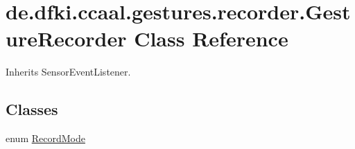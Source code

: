 \hypertarget{classde_1_1dfki_1_1ccaal_1_1gestures_1_1recorder_1_1_gesture_recorder}{\section{de.\-dfki.\-ccaal.\-gestures.\-recorder.\-Gesture\-Recorder Class Reference}
\label{classde_1_1dfki_1_1ccaal_1_1gestures_1_1recorder_1_1_gesture_recorder}
}


Inherits Sensor\-Event\-Listener.

\subsection*{Classes}
\begin{DoxyCompactItemize}
\item 
enum \hyperlink{enumde_1_1dfki_1_1ccaal_1_1gestures_1_1recorder_1_1_gesture_recorder_1_1_record_mode}{Record\-Mode}
\end{DoxyCompactItemize}

